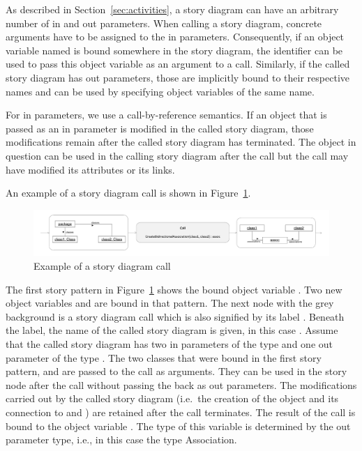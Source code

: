 As described in Section~\ref{sec:activities}, a story diagram can have an arbitrary number of in and out parameters. When calling a story diagram, concrete arguments have to be assigned to the in parameters. Consequently, if an object variable named  is bound somewhere in the story diagram, the identifier  can be used to pass this object variable as an argument to a call. Similarly, if the called story diagram has out parameters, those are implicitly bound to their respective names and can be used by specifying object variables of the same name.

For in parameters, we use a call-by-reference semantics. If an object that is passed as an in parameter is modified in the called story diagram, those modifications remain after the called story diagram has terminated. The object in question can be used in the calling story diagram after the call but the call may have modified its attributes or its links.

An example of a story diagram call is shown in Figure~\ref{fig:call}.

\begin{figure}[htb]
\begin{center}
  \includegraphics[width=\textwidth]{figures/StoryDiagramCall}
  \caption{Example of a story diagram call}
  \label{fig:call}
\end{center}
\end{figure}

The first story pattern in Figure~\ref{fig:call} shows the bound object variable . Two new object variables  and  are bound in that pattern. The next node with the grey background is a story diagram call which is also signified by its label . Beneath the label, the name of the called story diagram is given, in this case . Assume that the called story diagram has two in parameters of the type  and one out parameter of the type . The two classes that were bound in the first story pattern,  and  are passed to the call as arguments. They can be used in the story node after the call without passing the back as out parameters. The modifications carried out by the called story diagram (i.e.\ the creation of the  object and its connection to  and ) are retained after the call terminates.
The result of the call is bound to the object variable . The type of this variable is determined by the out parameter type, i.e., in this case the type Association.

